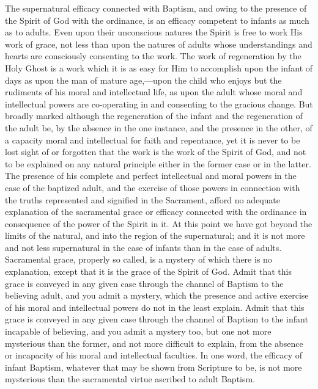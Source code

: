 \documentclass[
  english,
]{book}
\begin{document}
The supernatural efficacy connected with Baptism, and owing to the presence of the Spirit of God with the ordinance, is an efficacy competent to infants as much as to adults. Even upon their unconscious natures the Spirit is free to work His work of grace, not less than upon the natures of adults whose understandings and hearts are consciously consenting to the work. The work of regeneration by the Holy Ghost is a work which it is as easy for Him to accomplish upon the infant of days as upon the man of mature age,---upon the child who enjoys but the rudiments of his moral and intellectual life, as upon the adult whose moral and intellectual powers are co-operating in and consenting to the gracious change. But broadly marked although the regeneration of the infant and the regeneration of the adult be, by the absence in the one instance, and the presence in the other, of a capacity moral and intellectual for faith and repentance, yet it is never to be lost sight of or forgotten that the work is the work of the Spirit of God, and not to be explained on any natural principle either in the former case or in the latter. The presence of his complete and perfect intellectual and moral powers in the case of the baptized adult, and the exercise of those powers in connection with the truths represented and signified in the Sacrament, afford no adequate explanation of the sacramental grace or efficacy connected with the ordinance in consequence of the power of the Spirit in it. At this point we have got beyond the limits of the natural, and into the region of the supernatural; and it is not more and not less supernatural in the case of infants than in the case of adults. Sacramental grace, properly so called, is a mystery of which there is no explanation, except that it is the grace of the Spirit of God. Admit that this grace is conveyed in any given case through the channel of Baptism to the believing adult, and you admit a mystery, which the presence and active exercise of his moral and intellectual powers do not in the least explain. Admit that this grace is conveyed in any given case through the channel of Baptism to the infant incapable of believing, and you admit a mystery too, but one not more mysterious than the former, and not more difficult to explain, from the absence or incapacity of his moral and intellectual faculties. In one word, the efficacy of infant Baptism, whatever that may be shown from Scripture to be, is not more mysterious than the sacramental virtue ascribed to adult Baptism.
\end{document}
